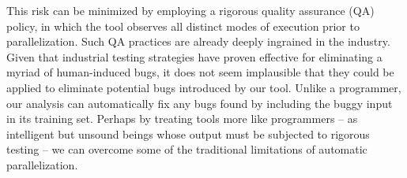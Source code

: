 This risk can be minimized by employing a rigorous quality assurance
(QA) policy, in which the tool observes all distinct modes of
execution prior to parallelization.  Such QA practices are already
deeply ingrained in the industry.
Given that industrial testing strategies have proven effective for
eliminating a myriad of human-induced bugs, it does not seem
implausible that they could be applied to eliminate potential bugs
introduced by our tool.  Unlike a programmer, our analysis can
automatically fix any bugs found by including the buggy input in its
training set.  Perhaps by treating tools more like programmers -- as
intelligent but unsound beings whose output must be subjected to
rigorous testing -- we can overcome some of the traditional
limitations of automatic parallelization.

